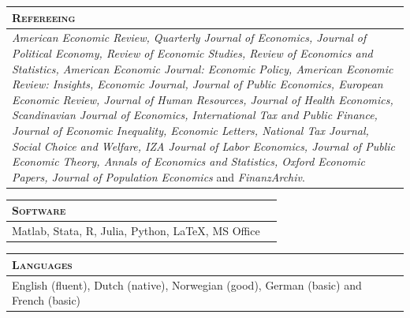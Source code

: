 \documentclass [11pt]{article}
\newcommand{\kiss}
{\vspace{0.5cm}}
\newcommand{\first} 
{13.8}
\newcommand{\second}
{2.5}
\newcommand{\thickrule}{\toprule}
\newcommand{\ttitle}[1]{\scshape{\Large {#1}}}
\begin{document}
\kiss
\begin{tabular}[t] { p{16.75cm} }
\ttitle{Refereeing} 
\\
\thickrule
\emph{American Economic Review, Quarterly Journal of Economics, Journal of Political Economy, Review of Economic Studies, Review of Economics and Statistics, American Economic Journal: Economic Policy, American Economic Review: Insights, Economic Journal, Journal of Public Economics, European Economic Review, Journal of Human Resources, Journal of Health Economics, Scandinavian Journal of Economics, International Tax and Public Finance, Journal of Economic Inequality, Economic Letters, National Tax Journal, Social Choice and Welfare, IZA Journal of Labor Economics, Journal of Public Economic Theory, Annals of Economics and Statistics, Oxford Economic Papers, Journal of Population Economics} and \emph{FinanzArchiv}.
\end{tabular}



\kiss



\begin{tabular}[t] {p{\first cm} p{\second cm} }
\ttitle{Software} &
\\
\thickrule
Matlab, Stata, R, Julia, Python, LaTeX, MS Office
\end{tabular}

\kiss

\begin{tabular}[t] {p{\first cm} p{\second cm} }
\ttitle{Languages} &
\\
\thickrule
English (fluent), Dutch (native), Norwegian (good), German (basic) and French (basic)  &
\end{tabular}
\end{document}
